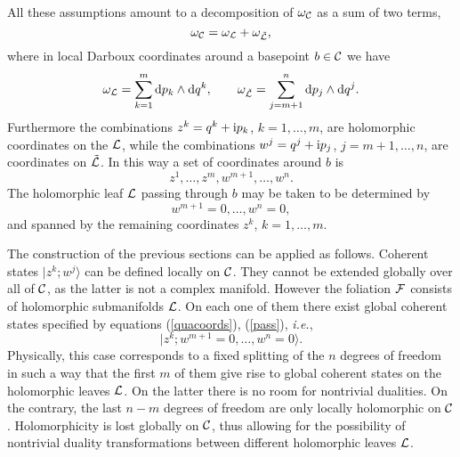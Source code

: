 \documentclass[a4paper,a4paper]{article}
\begin{document}
All these assumptions amount to a decomposition of $\omega_{\cal C}$
as a sum of two terms,  
\begin{equation}
\omega_{\cal C}=\omega_{\cal L} + \omega_{\tilde {\cal L}},
\label{twot}
\end{equation}
where in local Darboux coordinates around a basepoint $b\in {\cal C}$ we have
\begin{equation}
\omega_{\cal L}=
\sum_{k=1}^{m} {\rm d}p_k\wedge {\rm d}q^k, \qquad 
\omega_{\tilde {\cal L}}=
\sum_{j=m+1}^{n} {\rm d}p_j\wedge {\rm d}q^j.
\label{twoterms}
\end{equation}
Furthermore the combinations $z^k=q^k+{\rm i}p_k$, $k=1,\ldots, m$, 
are holomorphic coordinates on the ${\cal L}$, while the combinations 
$w^j=q^j+ {\rm i} p_j$, $j=m+1, \ldots, n$, are coordinates on $\tilde{\cal L}$. 
In this way a set of coordinates around $b$ is
\begin{equation}
z^1, \ldots, z^{m}, w^{m+1}, \ldots, w^n.
\label{quacoords}
\end{equation}
The holomorphic leaf ${\cal L}$ passing through $b$ may be taken to be
determined by
\begin{equation}
w^{m+1}=0,\ldots, w^n = 0,
\label{pass}
\end{equation}
and spanned by the remaining coordinates $z^k$, $k=1,\ldots, m$.

The construction of the previous sections can be applied as follows. 
Coherent states $|z^k;w^j\rangle$ can be defined locally on 
${\cal C}$. They cannot be extended globally over all of ${\cal C}$, 
as the latter is not a complex manifold. However the foliation ${\cal F}$ 
consists of holomorphic submanifolds ${\cal L}$. On each one of them there 
exist global coherent states specified by equations 
(\ref{quacoords}), (\ref{pass}), {\it i.e.}, 
\begin{equation}
|z^k;w^{m+1}=0,\ldots, w^n = 0\rangle.
\label{speci}
\end{equation}
Physically, this case corresponds to a fixed splitting of the $n$ degrees 
of freedom in such a way that the first $m$ of them give rise to global coherent 
states on the holomorphic leaves ${\cal L}$. On the latter there is no room 
for nontrivial dualities. On the contrary, the last $n-m$ degrees of freedom
are only locally holomorphic on ${\cal C}$. Holomorphicity is lost 
globally on ${\cal C}$, thus allowing for the possibility of nontrivial 
duality transformations between different holomorphic leaves ${\cal L}$. 
\end{document}

